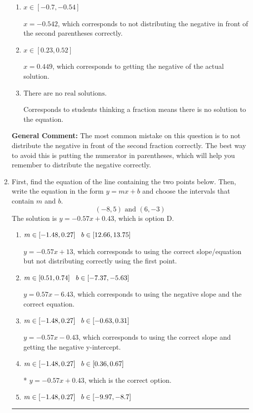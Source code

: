 \documentclass{extbook}[14pt]
\newcommand{\litem}[1]{\item #1

\rule{\textwidth}{0.4pt}}
\begin{document}
\begin{enumerate}
{\begin{enumerate}[label=\Alph*.]
* $x = 2.400$, which is the correct option.
\item \( x \in [-0.7, -0.54] \)

$x = -0.542$, which corresponds to not distributing the negative in front of the second parentheses correctly.
\item \( x \in [0.23, 0.52] \)

$x = 0.449$, which corresponds to getting the negative of the actual solution.
\item \( \text{There are no real solutions.} \)

Corresponds to students thinking a fraction means there is no solution to the equation.
\end{enumerate}

\textbf{General Comment:} The most common mistake on this question is to not distribute the negative in front of the second fraction correctly. The best way to avoid this is putting the numerator in parentheses, which will help you remember to distribute the negative correctly.
}
\litem{
First, find the equation of the line containing the two points below. Then, write the equation in the form $ y=mx+b $ and choose the intervals that contain $m$ and $b$.
\[ (-8, 5) \text{ and } (6, -3) \]The solution is \( y = -0.57x + 0.43 \), which is option D.\begin{enumerate}[label=\Alph*.]
\item \( m \in [-1.48, 0.27] \hspace*{3mm} b \in [12.66, 13.75] \)

 $y = -0.57x + 13$, which corresponds to using the correct slope/equation but not distributing correctly using the first point.
\item \( m \in [0.51, 0.74] \hspace*{3mm} b \in [-7.37, -5.63] \)

 $y = 0.57x -6.43$, which corresponds to using the negative slope and the correct equation.
\item \( m \in [-1.48, 0.27] \hspace*{3mm} b \in [-0.63, 0.31] \)

 $y = -0.57x -0.43$, which corresponds to using the correct slope and getting the negative y-intercept.
\item \( m \in [-1.48, 0.27] \hspace*{3mm} b \in [0.36, 0.67] \)

* $y = -0.57x + 0.43$, which is the correct option.
\item \( m \in [-1.48, 0.27] \hspace*{3mm} b \in [-9.97, -8.7] \)


\end{enumerate}}
\end{enumerate}
\end{document}
